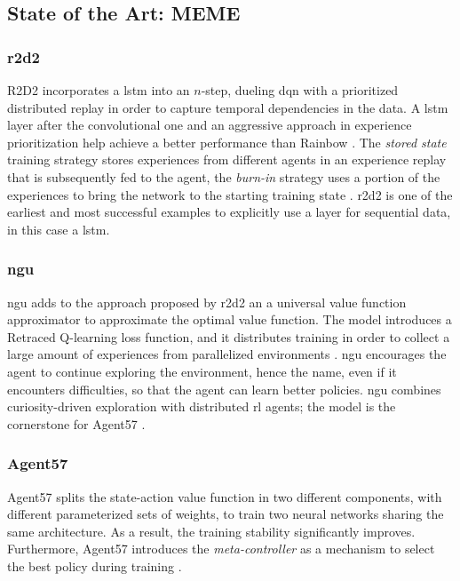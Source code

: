 \subsection{State of the Art: MEME}

\subsubsection{\acrfull{r2d2}}
R2D2 incorporates a \acrfull{lstm} into an $n$-step, dueling \acrshort{dqn} with a prioritized distributed replay in order to capture temporal dependencies in the data. A \acrfull{lstm} layer after the convolutional one and an aggressive approach in experience prioritization help achieve a better performance than Rainbow \cite{r2d2}. The \textit{stored state} training strategy stores experiences from different agents in an experience replay that is subsequently fed to the agent, the \textit{burn-in} strategy uses a portion of the experiences to bring the network to the starting training state \cite{r2d2}. \acrshort{r2d2} is one of the earliest and most successful examples to explicitly use a layer for sequential data, in this case a \acrshort{lstm}.

\subsubsection{\acrfull{ngu}}
\acrshort{ngu} adds to the approach proposed by \acrshort{r2d2} an a universal value function approximator to approximate the optimal value function. The model introduces a Retraced Q-learning loss function, and it distributes training in order to collect a large amount of experiences from parallelized environments \cite{never_give_up}. \acrshort{ngu} encourages the agent to continue exploring the environment, hence the name, even if it encounters difficulties, so that the agent can learn better policies. \acrshort{ngu} combines curiosity-driven exploration with distributed \acrshort{rl} agents; the model is the cornerstone for Agent57 \cite{agent57}.

\subsubsection{Agent57}
Agent57 splits the state-action value function in two different components, with different parameterized sets of weights, to train two neural networks sharing the same architecture. As a result, the training stability significantly improves. Furthermore, Agent57 introduces the \textit{meta-controller} as a mechanism to select the best policy during training \cite{agent57}.

